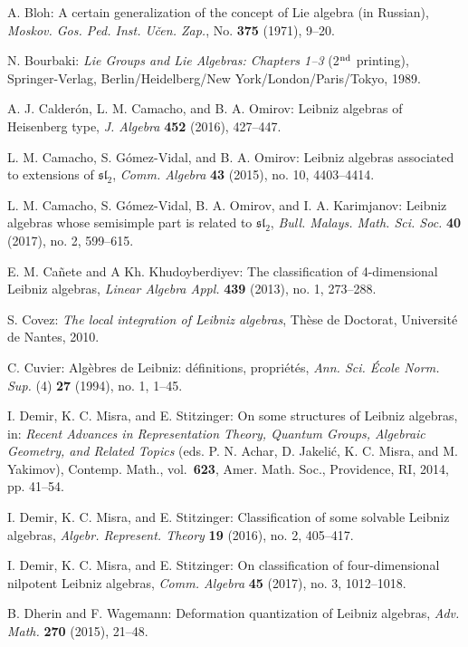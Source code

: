 \documentclass{amsart}
\numberwithin{equation}{section}
\newcommand{\slf}{\mathfrak{sl}}
\begin{document}
\begin{thebibliography}{99}
A. Bloh:
A certain generalization of the concept of Lie algebra (in Russian),
{\it Moskov. Gos. Ped. Inst. U\v{c}en. Zap.\/}, No. {\bf 375} (1971), 9--20.

N. Bourbaki:
{\it Lie Groups and Lie Algebras: Chapters 1--3\/} (2$^{\rm nd}$ printing),
Springer-Verlag, Berlin/Heidelberg/New York/London/Paris/Tokyo, 1989.

A. J. Calder\'on, L. M. Camacho, and B. A. Omirov:
Leibniz algebras of Heisenberg type,
{\it J. Algebra\/} {\bf 452} (2016), 427--447.

L. M. Camacho, S. G\'omez-Vidal, and B. A. Omirov:
Leibniz algebras associated to extensions of $\slf_2$,
{\it Comm. Algebra\/} {\bf 43} (2015), no. 10, 4403--4414.

L. M. Camacho, S. G\'omez-Vidal, B. A. Omirov, and I. A. Karimjanov:
Leibniz algebras whose semisimple part is related to $\slf_2$,
{\it Bull. Malays. Math. Sci. Soc.\/} {\bf 40} (2017), no. 2, 599--615.

E. M. Ca\~nete and A Kh. Khudoyberdiyev:
The classification of 4-dimensional Leibniz algebras,
{\it Linear Algebra Appl.\/} {\bf 439} (2013), no. 1, 273--288.

S. Covez:
{\it The local integration of Leibniz algebras\/},
Th\`ese de Doctorat, Universit\'e de Nantes, 2010.

C. Cuvier: Alg\`ebres de Leibniz: d\'efinitions, propri\'et\'es,
{\it Ann. Sci. \'Ecole Norm. Sup.\/} (4) {\bf 27} (1994), no. 1, 1--45.

I. Demir, K. C. Misra, and E. Stitzinger:
On some structures of Leibniz algebras,
in: {\it Recent Advances in Representation Theory, Quantum Groups, Algebraic Geometry,
and Related Topics\/} (eds. P. N. Achar, D. Jakeli\'c, K. C. Misra, and M. Yakimov), 
Contemp. Math., vol.~{\bf 623}, Amer. Math. Soc., Providence, RI, 2014, pp. 41--54.

I. Demir, K. C. Misra, and E. Stitzinger:
Classification of some solvable Leibniz algebras,
{\it Algebr. Represent. Theory\/} {\bf 19} (2016), no. 2, 405--417.

I. Demir, K. C. Misra, and E. Stitzinger:
On classification of four-dimensional nilpotent Leibniz algebras,
{\it Comm. Algebra\/} {\bf 45} (2017), no. 3, 1012--1018.

B. Dherin and F. Wagemann:
Deformation quantization of Leibniz algebras,
{\it Adv. Math.\/} {\bf 270} (2015), 21--48.


\end{thebibliography}
\end{document}
